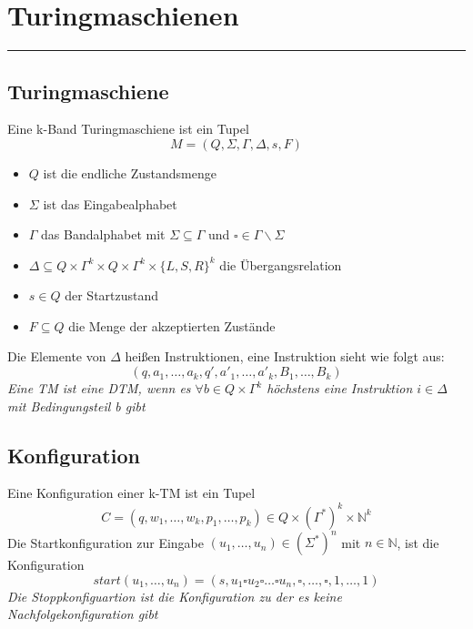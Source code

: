 \section{Turingmaschienen} 
\rule{\textwidth}{0.4pt}
\newpage
\subsection{Turingmaschiene}
    Eine k-Band Turingmaschiene ist ein Tupel \[M=(Q,\Sigma,\Gamma,\Delta,s,F)\]
    \begin{itemize}
        \item \(Q\) ist die endliche Zustandsmenge
        \item \(\Sigma\) ist das Eingabealphabet
        \item \(\Gamma\) das Bandalphabet mit \(\Sigma\subseteq\Gamma\) und \(\square\in\Gamma\backslash\Sigma\)
        \item \(\Delta\subseteq Q\times\Gamma^k\times Q\times\Gamma^k\times {\{L,S,R\}}^k\) die Übergangsrelation
        \item \(s\in Q\) der Startzustand
        \item \(F\subseteq Q\) die Menge der akzeptierten Zustände
    \end{itemize}
    Die Elemente von \(\Delta\) heißen Instruktionen, eine Instruktion sieht wie folgt aus:
    \[(q,a_1,\dots,a_k,q',a'_1,\dots,a'_k,B_1,\dots,B_k)\]
    \textit{Eine TM ist eine DTM, wenn es \(\forall b\in Q\times\Gamma^k\) höchstens eine Instruktion \(i\in \Delta\) mit Bedingungsteil b gibt}
\subsection{Konfiguration}
    Eine Konfiguration einer k-TM ist ein Tupel 
    \[C=(q,w_1,\dots,w_k,p_1,\dots,p_k)\in Q \times (\Gamma^*)^k \times \mathbb{N}^k\]
    Die Startkonfiguration zur Eingabe \((u_1,\dots,u_n)\in(\Sigma^*)^n\) mit \(n\in\mathbb{N}\), ist die Konfiguration
    \[start(u_1,\dots,u_n)=(s,u_1\square u_2\square\dots\square u_n,\square,\dots,\square,1,\dots,1)\]
    \textit{Die Stoppkonfiguartion ist die Konfiguration zu der es keine Nachfolgekonfiguration gibt}
